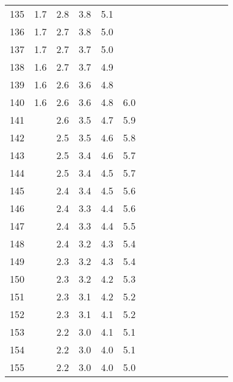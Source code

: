\documentclass[]{article}
\begin{document}
\begin{table}
\begin{tabular}{l|lllllllllll}
    135      & 1.7 & 2.8 & 3.8 & 5.1  & ~    & ~ & ~   & ~   & ~     & ~   & ~   \\
    136      & 1.7 & 2.7 & 3.8 & 5.0  & ~    & ~ & ~   & ~   & ~     & ~   & ~   \\
    137      & 1.7 & 2.7 & 3.7 & 5.0  & ~    & ~ & ~   & ~   & ~     & ~   & ~   \\
    138      & 1.6 & 2.7 & 3.7 & 4.9  & ~    & ~ & ~   & ~   & ~     & ~   & ~   \\
    139      & 1.6 & 2.6 & 3.6 & 4.8  & ~    & ~ & ~   & ~   & ~     & ~   & ~   \\
    140      & 1.6 & 2.6 & 3.6 & 4.8  & 6.0  & ~ & ~   & ~   & ~     & ~   & ~   \\
    141      & ~   & 2.6 & 3.5 & 4.7  & 5.9  & ~ & ~   & ~   & ~     & ~   & ~   \\
    142      & ~   & 2.5 & 3.5 & 4.6  & 5.8  & ~ & ~   & ~   & ~     & ~   & ~   \\
    143      & ~   & 2.5 & 3.4 & 4.6  & 5.7  & ~ & ~   & ~   & ~     & ~   & ~   \\
    144      & ~   & 2.5 & 3.4 & 4.5  & 5.7  & ~ & ~   & ~   & ~     & ~   & ~   \\
    145      & ~   & 2.4 & 3.4 & 4.5  & 5.6  & ~ & ~   & ~   & ~     & ~   & ~   \\
    146      & ~   & 2.4 & 3.3 & 4.4  & 5.6  & ~ & ~   & ~   & ~     & ~   & ~   \\
    147      & ~   & 2.4 & 3.3 & 4.4  & 5.5  & ~ & ~   & ~   & ~     & ~   & ~   \\
    148      & ~   & 2.4 & 3.2 & 4.3  & 5.4  & ~ & ~   & ~   & ~     & ~   & ~   \\
    149      & ~   & 2.3 & 3.2 & 4.3  & 5.4  & ~ & ~   & ~   & ~     & ~   & ~   \\
    150      & ~   & 2.3 & 3.2 & 4.2  & 5.3  & ~ & ~   & ~   & ~     & ~   & ~   \\
    151      & ~   & 2.3 & 3.1 & 4.2  & 5.2  & ~ & ~   & ~   & ~     & ~   & ~   \\
    152      & ~   & 2.3 & 3.1 & 4.1  & 5.2  & ~ & ~   & ~   & ~     & ~   & ~   \\
    153      & ~   & 2.2 & 3.0 & 4.1  & 5.1  & ~ & ~   & ~   & ~     & ~   & ~   \\
    154      & ~   & 2.2 & 3.0 & 4.0  & 5.1  & ~ & ~   & ~   & ~     & ~   & ~   \\
    155      & ~   & 2.2 & 3.0 & 4.0  & 5.0  & ~ & ~   & ~   & ~     & ~   & ~   \\

\end{tabular}
\end{table}
\end{document}
